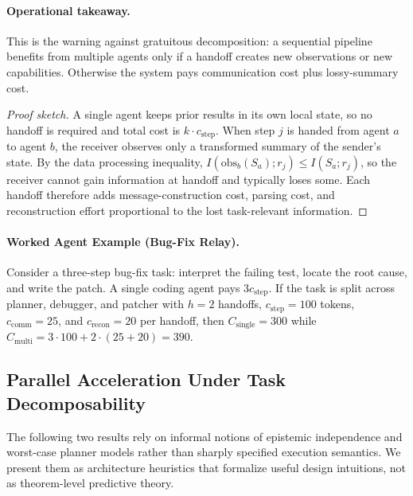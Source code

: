 \paragraph{Operational takeaway.}
This is the warning against gratuitous decomposition: a sequential pipeline benefits from multiple agents
only if a handoff creates new observations or new capabilities. Otherwise the system pays communication
cost plus lossy-summary cost.

\begin{proof}[Proof sketch]
A single agent keeps prior results in its own local state, so no handoff is required and total cost is
$k \cdot c_{\mathrm{step}}$. When step $j$ is handed from agent $a$ to agent $b$, the receiver observes
only a transformed summary of the sender's state. By the data processing inequality,
$I(\mathrm{obs}_b(S_a); r_j) \le I(S_a; r_j)$, so the receiver cannot gain information at handoff and
typically loses some. Each handoff therefore adds message-construction cost, parsing cost, and
reconstruction effort proportional to the lost task-relevant information.
\end{proof}

\paragraph{Worked Agent Example (Bug-Fix Relay).}
Consider a three-step bug-fix task: interpret the failing test, locate the root cause, and write the
patch. A single coding agent pays $3c_{\mathrm{step}}$. If the task is split across planner, debugger,
and patcher with $h=2$ handoffs, $c_{\mathrm{step}}=100$ tokens, $c_{\mathrm{comm}}=25$, and
$c_{\mathrm{recon}}=20$ per handoff, then $C_{\mathrm{single}}=300$ while
$C_{\mathrm{multi}}=3\cdot100+2\cdot(25+20)=390$.

\subsection{Parallel Acceleration Under Task Decomposability}

\medskip
\noindent
The following two results rely on informal notions of epistemic independence
and worst-case planner models rather than sharply specified execution
semantics.  We present them as architecture heuristics that formalize useful
design intuitions, not as theorem-level predictive theory.
\medskip

